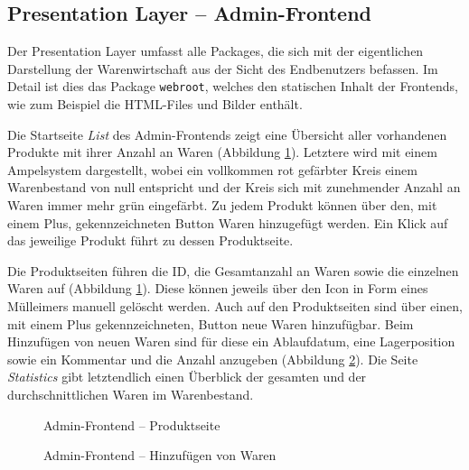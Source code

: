 \subsection{Presentation Layer -- Admin-Frontend}
\label{subsec: Presentation Layer}
Der Presentation Layer umfasst alle  Packages, die sich mit der eigentlichen Darstellung der Warenwirtschaft aus der Sicht des Endbenutzers befassen. Im Detail ist dies das Package \texttt{webroot}, welches den statischen Inhalt der Frontends, wie zum Beispiel die HTML-Files und Bilder enthält. \par 
Die Startseite \textit{List} des Admin-Frontends zeigt eine Übersicht aller vorhandenen Produkte mit ihrer Anzahl an Waren (Abbildung \ref{pic:Admin-Frontend -- Produktseite}). Letztere wird mit einem Ampelsystem dargestellt, wobei ein vollkommen rot gefärbter Kreis einem Warenbestand von null entspricht und der Kreis sich mit zunehmender Anzahl an Waren immer mehr grün eingefärbt. Zu jedem Produkt können über den, mit einem  Plus, gekennzeichneten Button Waren hinzugefügt werden. Ein Klick auf das jeweilige Produkt führt zu dessen Produktseite. \par 
Die Produktseiten führen die ID, die Gesamtanzahl an Waren sowie die einzelnen Waren auf (Abbildung \ref{pic:Admin-Frontend -- Produktseite}). Diese können jeweils über den Icon in Form eines Mülleimers manuell gelöscht werden. Auch auf den Produktseiten sind über einen, mit einem Plus gekennzeichneten, Button neue Waren hinzufügbar. Beim Hinzufügen von neuen Waren sind für diese ein Ablaufdatum, eine Lagerposition sowie ein Kommentar und die Anzahl anzugeben (Abbildung \ref{pic:Admin-Frontend -- Hinzufuegen von Waren}). Die Seite \textit{Statistics} gibt letztendlich einen Überblick der gesamten und der durchschnittlichen Waren im Warenbestand.

\begin{figure}[H]
	\centering
	\caption{Admin-Frontend -- Produktseite}
	\label{pic:Admin-Frontend -- Produktseite}
\end{figure}


\begin{figure}[H]
	\centering
	\caption{Admin-Frontend -- Hinzufügen von Waren}
	\label{pic:Admin-Frontend -- Hinzufuegen von Waren}
\end{figure}



